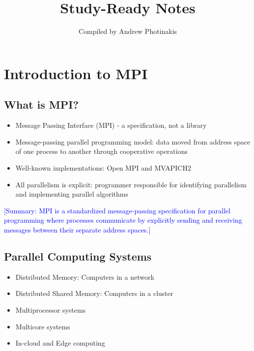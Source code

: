 \documentclass[12pt]{article}
\title{\TOPICTITLE\\\large Study-Ready Notes}
\author{Compiled by Andrew Photinakis}
\date{}
\begin{document}
\maketitle
\tableofcontents
\newpage


\section{Introduction to MPI}

\subsection{What is MPI?}
\begin{itemize}
    \item Message Passing Interface (MPI) - a specification, not a library
    \item Message-passing parallel programming model: data moved from address space of one process to another through cooperative operations
    \item Well-known implementations: Open MPI and MVAPICH2
    \item All parallelism is explicit: programmer responsible for identifying parallelism and implementing parallel algorithms
\end{itemize}

\textcolor{blue}{[Summary: MPI is a standardized message-passing specification for parallel programming where processes communicate by explicitly sending and receiving messages between their separate address spaces.]}

\subsection{Parallel Computing Systems}
\begin{itemize}
    \item Distributed Memory: Computers in a network
    \item Distributed Shared Memory: Computers in a cluster
    \item Multiprocessor systems
    \item Multicore systems
    \item In-cloud and Edge computing
\end{itemize}
\end{document}
